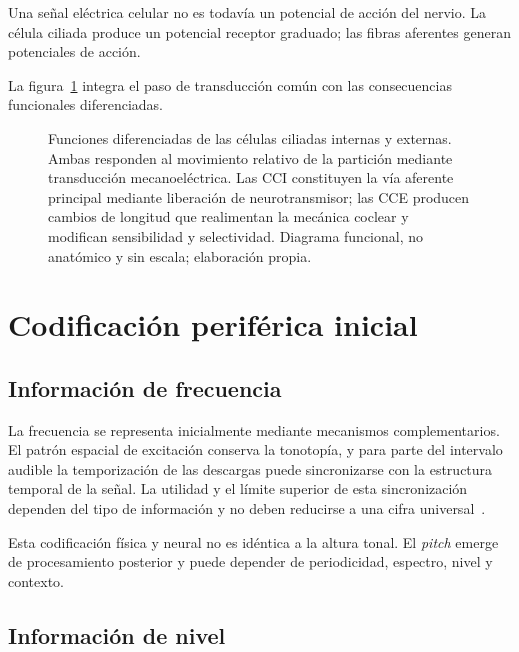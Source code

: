 Una señal eléctrica celular no es todavía un potencial de acción del nervio.
La célula ciliada produce un potencial receptor graduado; las fibras
aferentes generan potenciales de acción.

La figura~\ref{fig:u6-funciones-cci-cce} integra el paso de transducción común
con las consecuencias funcionales diferenciadas.

\begin{figure}[!htbp]
    \centering
    
    \caption{Funciones diferenciadas de las células ciliadas internas y
    externas. Ambas responden al movimiento relativo de la partición mediante
    transducción mecanoeléctrica. Las CCI constituyen la vía aferente principal
    mediante liberación de neurotransmisor; las CCE producen cambios de
    longitud que realimentan la mecánica coclear y modifican sensibilidad y
    selectividad. Diagrama funcional, no anatómico y sin escala; elaboración
    propia.}
    \label{fig:u6-funciones-cci-cce}
\end{figure}

\section{Codificación periférica inicial}
\label{sec:u6-codificacion}

\subsection{Información de frecuencia}
\label{sec:u6-codigo-frecuencia}

La frecuencia se representa inicialmente mediante mecanismos
complementarios. El patrón espacial de excitación conserva la tonotopía, y
para parte del intervalo audible la temporización de las descargas puede
sincronizarse con la estructura temporal de la señal. La utilidad y el límite
superior de esta sincronización dependen del tipo de información y no deben
reducirse a una cifra universal~\cite{fettiplace2017,capraraPeng2022}.

Esta codificación física y neural no es idéntica a la altura tonal. El
\emph{pitch} emerge de procesamiento posterior y puede depender de
periodicidad, espectro, nivel y contexto.

\subsection{Información de nivel}
\label{sec:u6-codigo-nivel}

